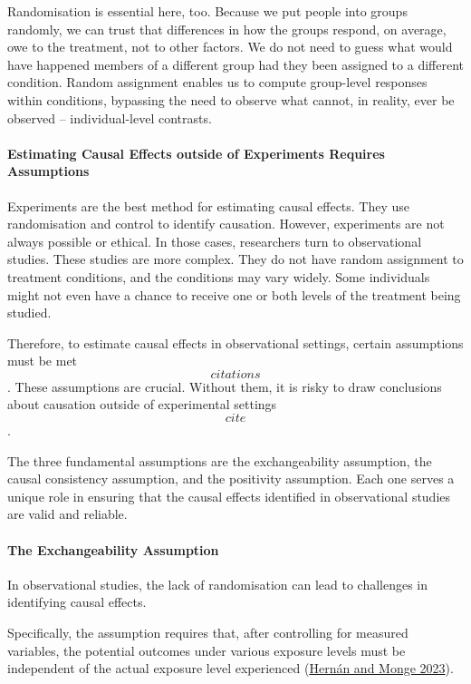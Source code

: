 \documentclass[
  singlecolumn]{article}
\let\oldparagraph\paragraph
\renewcommand{\paragraph}[1]{\oldparagraph{#1}\mbox{}}
\begin{document}
Randomisation is essential here, too. Because we put people into groups
randomly, we can trust that differences in how the groups respond, on
average, owe to the treatment, not to other factors. We do not need to
guess what would have happened members of a different group had they
been assigned to a different condition. Random assignment enables us to
compute group-level responses within conditions, bypassing the need to
observe what cannot, in reality, ever be observed -- individual-level
contrasts.

\paragraph{\texorpdfstring{\textbf{Estimating Causal Effects outside of
Experiments Requires
Assumptions}}{Estimating Causal Effects outside of Experiments Requires Assumptions}}\label{estimating-causal-effects-outside-of-experiments-requires-assumptions}

Experiments are the best method for estimating causal effects. They use
randomisation and control to identify causation. However, experiments
are not always possible or ethical. In those cases, researchers turn to
observational studies. These studies are more complex. They do not have
random assignment to treatment conditions, and the conditions may vary
widely. Some individuals might not even have a chance to receive one or
both levels of the treatment being studied.

Therefore, to estimate causal effects in observational settings, certain
assumptions must be met \[citations\]. These assumptions are crucial.
Without them, it is risky to draw conclusions about causation outside of
experimental settings \[cite\].

The three fundamental assumptions are the exchangeability assumption,
the causal consistency assumption, and the positivity assumption. Each
one serves a unique role in ensuring that the causal effects identified
in observational studies are valid and reliable.

\paragraph{\texorpdfstring{\textbf{The Exchangeability
Assumption}}{The Exchangeability Assumption}}\label{the-exchangeability-assumption}

In observational studies, the lack of randomisation can lead to
challenges in identifying causal effects.

Specifically, the assumption requires that, after controlling for
measured variables, the potential outcomes under various exposure levels
must be independent of the actual exposure level experienced
(\hyperref[ref-hernuxe1n2023]{Hernán and Monge 2023}).
\end{document}

